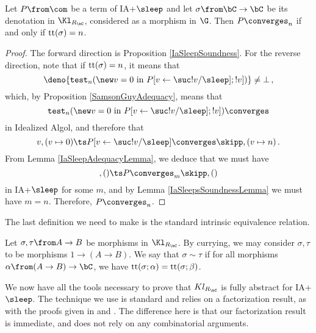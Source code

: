 \begin{theorem}
  Let $P\from\com$ be a term of IA+$\sleep$ and let $\sigma\from \bC\to \bC$ be its denotation in $\Kl_{R_\bC}$, considered as a morphism in $\G$.
  Then $P\converges_n$ if and only if $\mathrm{tt}(\sigma)=n$.
  \label{IaSleepComputationalAdequacy}
\end{theorem}
\begin{proof}
  The forward direction is Proposition \ref{IaSleepSoundness}.  
  For the reverse direction, note that if $\mathrm{tt}(\sigma)=n$, it means that
  \[
    \deno{\test_n(\new v=0\text{ in }P[v\gets \suc!v/\sleep];!v])} \ne \bot\,,
  \]
  which, by Proposition \ref{SamsonGuyAdequacy}, means that
  \[
    \test_n(\new v=0\text{ in } P[v\gets\suc!v/\sleep];!v])\converges
  \]
  in Idealized Algol, and therefore that
  \[
    v,(v\mapsto 0) \ts P[v\gets\suc!v/\sleep]\converges \skipp,(v\mapsto n)\,.
    \]
  From Lemma \ref{IaSleepAdequacyLemma}, we deduce that we must have
  \[
    ,() \ts P \converges_m \skipp,()
    \]
  in IA+$\sleep$ for some $m$, and by Lemma \ref{IaSleepsSoundnessLemma} we must have $m=n$.  
  Therefore, $P\converges_n$.
\end{proof}

The last definition we need to make is the standard intrinsic equivalence relation.

\begin{definition}
  Let $\sigma,\tau\from A \to B$ be morphisms in $\Kl_{R_\bC}$.  
  By currying, we may consider $\sigma,\tau$ to be morphisms $1 \to (A \to B)$.  
  We say that $\sigma\sim\tau$ if for all morphisms $\alpha\from (A \to B) \to \bC$, we have $\mathrm{tt}(\sigma;\alpha)=\mathrm{tt}(\sigma;\beta)$.
\end{definition}

We now have all the tools necessary to prove that $Kl_{R_\bC}$ is fully abstract for IA+$\sleep$.
The technique we use is standard and relies on a factorization result, as with the proofs given in \cite{SamsonGuyIAActive} and \cite{mcCHFiniteND}.  
The difference here is that our factorization result is immediate, and does not rely on any combinatorial arguments.

